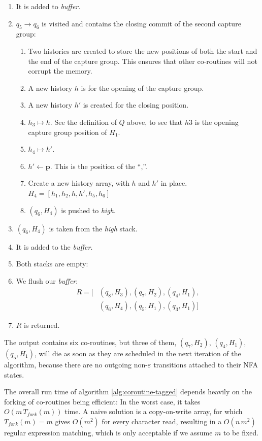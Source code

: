\documentclass[11pt,a4paper,twoside,openright]{Thesis}
\theoremstyle{definition}
\newcommand{\pos}{\mathbf{\mathbf{p}}}
\begin{document}
\begin{example}
\begin{enumerate}
\item It is added to \emph{buffer}.
\item $q_5\rightarrow q_6$ is visited and contains the closing commit of the
  second capture group:\begin{enumerate}
  \item Two histories are created to store the new positions of both the start
    and the end of the capture group. This ensures that other co-routines will
    not corrupt the memory.
	\item A new history $h$ is for the opening of the capture group.
	\item A new history $h'$ is created for the closing position.
  \item $h_3 \mapsto h$. See the definition of $Q$ above, to see that $h3$ is
    the opening capture group position of $H_1$.
	\item $h_4 \mapsto h'$.
	\item $h'\leftarrow\pos$. This is the position of the ``,''.
	\item Create a new history array, with $h$ and $h'$ in place. 
		$H_4 = [h_1, h_2, h, h', h_5, h_6]$
	\item $(q_6, H_4)$ is pushed to \emph{high}.
\end{enumerate}
\item $(q_6, H_4)$ is taken from the \emph{high} stack.
\item It is added to the \emph{buffer}.
\item Both stacks are empty:
\item We flush our \emph{buffer}: 
\begin{align*}
R=[&(q_8, H_3), (q_7, H_2), (q_4, H_1),\\ &(q_6, H_4), (q_5, H_1), (q_3, H_1)]
\end{align*}
\item $R$ is returned.
\end{enumerate}
\end{example}

The output contains six co-routines, but three of them,  $(q_7, H_2)$,
$(q_4, H_1)$,  $(q_5, H_1)$, will die as soon as they are scheduled in
the next iteration of the algorithm, because there are no outgoing
non-$\varepsilon$ transitions attached to their NFA states.

The overall run time of algorithm \ref{alg:coroutine-tagged} depends heavily on the 
forking of co-routines being efficient: In the worst case, it takes
$O(m\, T_{fork}(m))$ time. A naive solution is a copy-on-write array, for
which $T_{fork}(m)=m$ gives $O(m^2)$ for every character read, resulting
in a $O(n\,m^2)$ regular expression matching, which is only acceptable
if we assume $m$ to be fixed.
\end{document}
